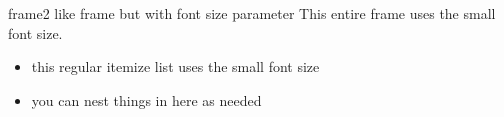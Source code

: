 \documentclass[11pt,compress,t,notes=noshow, xcolor=table]{beamer}
\begin{document}

\begin{frame2}[small]{frame2 like frame but with font size parameter}
  This entire frame uses the small font size.
  
  \begin{itemize}
    \item this regular itemize list uses the small font size
    \item you can nest things in here as needed
  \end{itemize}
\end{frame2}


\endlecture
\end{document}

